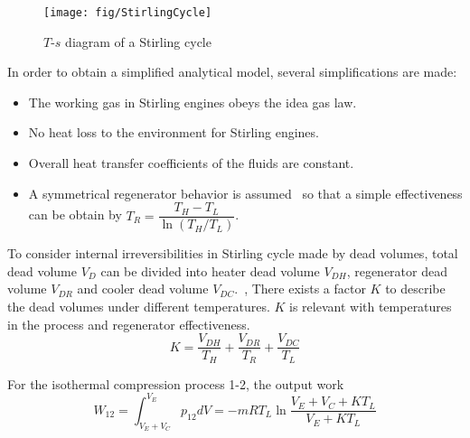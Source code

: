 \noindent \begin{figure}[htbp]
\begin{center}
	\texttt{[image: fig/StirlingCycle]}
	\caption{$T$-$s$ diagram of a Stirling cycle}
	\label{fig:StirlingCycle}
\end{center}
\end{figure}

In order to obtain a simplified analytical model, several simplifications are made:

\begin{itemize}
\item The working gas in Stirling engines obeys the idea gas law.
\item No heat loss to the environment for Stirling engines.
\item Overall heat transfer coefficients of the fluids are constant.
\item A symmetrical regenerator behavior is assumed~\cite{Formosa2010,Juhasz2010} so that a simple effectiveness can be obtain by $T_{R}=\dfrac{T_{H}-T_{L}}{\ln(T_{H}/T_{L})}$.
\end{itemize}

To consider internal irreversibilities in Stirling cycle made by dead volumes, total dead volume $V_D$ can be divided into heater dead volume $V_{DH}$, regenerator dead volume $V_{DR}$ and cooler dead volume $V_{DC}$.~\cite{Duan2014}, There exists a factor $K$ to describe the dead volumes under different temperatures. $K$ is relevant with temperatures in the process and regenerator effectiveness.
\begin{equation}
	K = \frac{V_{DH}}{T_H} + \frac{V_{DR}}{T_R} + \frac{V_{DC}}{T_L}
\end{equation}

For the isothermal compression process 1-2, the output work
\begin{equation}
	W_{12} = \int^{V_E}_{V_E+V_C}{p_{12}dV}=-mRT_L\ln{\frac{V_E+V_C+KT_L}{V_E+KT_L}}
\end{equation}

